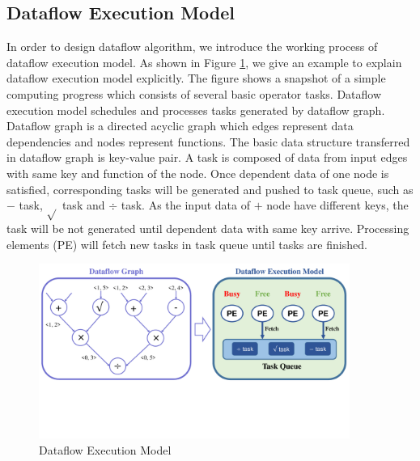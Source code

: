 \documentclass{llncs}
\begin{document}
\subsection{Dataflow Execution Model}
\vspace{-5pt}
In order to design dataflow algorithm, we introduce the working process of dataflow execution model. As shown in Figure \ref{fig:dataflowModel}, we give an example to explain dataflow execution model explicitly. The figure shows a snapshot of a simple computing progress which consists of several basic operator tasks. Dataflow execution model schedules and processes tasks generated by dataflow graph. Dataflow graph is a directed acyclic graph which edges represent data dependencies and nodes represent functions. The basic data structure transferred in dataflow graph is key-value pair. A task is composed of data from input edges with same key and function of the node. Once dependent data of one node is satisfied, corresponding tasks will be generated and pushed to task queue, such as $-$ task, $\sqrt{ }$ task and $\div$ task. As the input data of $+$ node have different keys, the task will be not generated until dependent data with same key arrive. Processing elements (PE) will fetch new tasks in task queue until tasks are finished.

\begin{figure}[!t]
\centering
\includegraphics[width=4in]{pics/dataflowModel.pdf}
\vspace{-60pt}
\caption{Dataflow Execution Model}
\label{fig:dataflowModel}
\vspace{-15pt}
\end{figure}

\vspace{-10pt}
\end{document}
